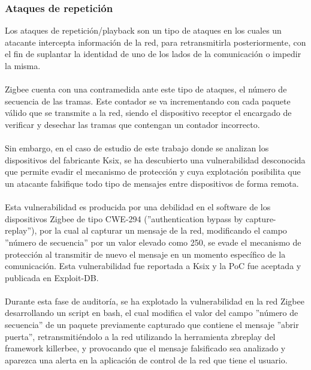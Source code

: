 \subsubsection{Ataques de repetición} %
Los ataques de repetición/playback son un tipo de ataques en los cuales un atacante intercepta información de la red, para retransmitirla posteriormente, con el fin de suplantar la identidad de uno de los lados de la comunicación o impedir la misma.
\\\\
Zigbee cuenta con una contramedida ante este tipo de ataques, el número de secuencia de las tramas. Este contador se va incrementando con cada paquete válido que se transmite a la red, siendo el dispositivo receptor el encargado de verificar y desechar las tramas que contengan un contador incorrecto.
\\\\
Sin embargo, en el caso de estudio de este trabajo donde se analizan los dispositivos del fabricante Ksix, se ha descubierto una vulnerabilidad desconocida \cite{exploitdb} que permite evadir el mecanismo de protección y cuya explotación posibilita que un atacante falsifique todo tipo de mensajes entre dispositivos de forma remota.
\\\\
Esta vulnerabilidad es producida por una debilidad en el software de los dispositivos Zigbee de tipo CWE-294 (''authentication bypass by capture-replay''), por la cual al capturar un mensaje de la red, modificando el campo ''número de secuencia'' por un valor elevado como 250, se evade el mecanismo de protección al transmitir de nuevo el mensaje en un momento específico de la comunicación. Esta vulnerabilidad fue reportada a Ksix y la PoC fue aceptada y publicada en Exploit-DB.
\\\\
Durante esta fase de auditoría, se ha explotado la vulnerabilidad en la red Zigbee desarrollando un script en bash, el cual modifica el valor del campo ''número de secuencia'' de un paquete previamente capturado que contiene el mensaje ''abrir puerta'', retransmitiéndolo a la red utilizando la herramienta zbreplay del framework killerbee, y provocando que el mensaje falsificado sea analizado y aparezca una alerta en la aplicación de control de la red que tiene el usuario.
\clearpage
